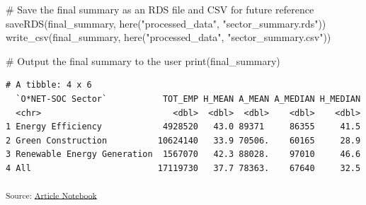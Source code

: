\documentclass[
  letterpaper,
  DIV=11,
  numbers=noendperiod]{scrartcl}
\newenvironment{Shaded}{\begin{snugshade}}{\end{snugshade}}
\newcommand{\CommentTok}[1]{\textcolor[rgb]{0.37,0.37,0.37}{#1}}
\newcommand{\FunctionTok}[1]{\textcolor[rgb]{0.28,0.35,0.67}{#1}}
\newcommand{\NormalTok}[1]{\textcolor[rgb]{0.00,0.23,0.31}{#1}}
\newcommand{\StringTok}[1]{\textcolor[rgb]{0.13,0.47,0.30}{#1}}
\begin{document}
\begin{Shaded}
\begin{Highlighting}[]
\CommentTok{\# Save the final summary as an RDS file and CSV for future reference}
\FunctionTok{saveRDS}\NormalTok{(final\_summary, }\FunctionTok{here}\NormalTok{(}\StringTok{"processed\_data"}\NormalTok{, }\StringTok{"sector\_summary.rds"}\NormalTok{))}
\FunctionTok{write\_csv}\NormalTok{(final\_summary, }\FunctionTok{here}\NormalTok{(}\StringTok{"processed\_data"}\NormalTok{, }\StringTok{"sector\_summary.csv"}\NormalTok{))}

\CommentTok{\# Output the final summary to the user}
\FunctionTok{print}\NormalTok{(final\_summary)}
\end{Highlighting}
\end{Shaded}

\begin{verbatim}
# A tibble: 4 x 6
  `O*NET-SOC Sector`           TOT_EMP H_MEAN A_MEAN A_MEDIAN H_MEDIAN
  <chr>                          <dbl>  <dbl>  <dbl>    <dbl>    <dbl>
1 Energy Efficiency            4928520   43.0 89371     86355     41.5
2 Green Construction          10624140   33.9 70506.    60165     28.9
3 Renewable Energy Generation  1567070   42.3 88028.    97010     46.6
4 All                         17119730   37.7 78363.    67640     32.5
\end{verbatim}

\textsubscript{Source:
\href{https://beeckcenter.github.io/climate-equity-workforce/index-preview.html}{Article
Notebook}}
\end{document}
